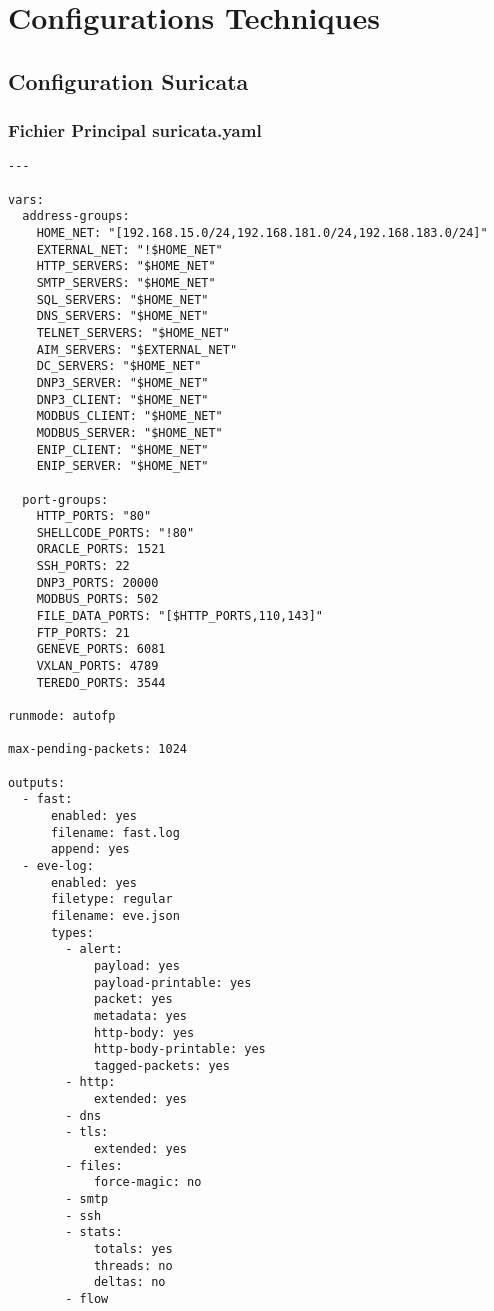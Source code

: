 \appendix

\chapter{Configurations Techniques}

\section{Configuration Suricata}

\subsection{Fichier Principal suricata.yaml}

\begin{lstlisting}[style=yamlstyle,caption=Configuration Suricata pour environnement hospitalier]
%YAML 1.1
---

vars:
  address-groups:
    HOME_NET: "[192.168.15.0/24,192.168.181.0/24,192.168.183.0/24]"
    EXTERNAL_NET: "!$HOME_NET"
    HTTP_SERVERS: "$HOME_NET"
    SMTP_SERVERS: "$HOME_NET"
    SQL_SERVERS: "$HOME_NET"
    DNS_SERVERS: "$HOME_NET"
    TELNET_SERVERS: "$HOME_NET"
    AIM_SERVERS: "$EXTERNAL_NET"
    DC_SERVERS: "$HOME_NET"
    DNP3_SERVER: "$HOME_NET"
    DNP3_CLIENT: "$HOME_NET"
    MODBUS_CLIENT: "$HOME_NET"
    MODBUS_SERVER: "$HOME_NET"
    ENIP_CLIENT: "$HOME_NET"
    ENIP_SERVER: "$HOME_NET"

  port-groups:
    HTTP_PORTS: "80"
    SHELLCODE_PORTS: "!80"
    ORACLE_PORTS: 1521
    SSH_PORTS: 22
    DNP3_PORTS: 20000
    MODBUS_PORTS: 502
    FILE_DATA_PORTS: "[$HTTP_PORTS,110,143]"
    FTP_PORTS: 21
    GENEVE_PORTS: 6081
    VXLAN_PORTS: 4789
    TEREDO_PORTS: 3544

runmode: autofp

max-pending-packets: 1024

outputs:
  - fast:
      enabled: yes
      filename: fast.log
      append: yes
  - eve-log:
      enabled: yes
      filetype: regular
      filename: eve.json
      types:
        - alert:
            payload: yes
            payload-printable: yes
            packet: yes
            metadata: yes
            http-body: yes
            http-body-printable: yes
            tagged-packets: yes
        - http:
            extended: yes
        - dns
        - tls:
            extended: yes
        - files:
            force-magic: no
        - smtp
        - ssh
        - stats:
            totals: yes
            threads: no
            deltas: no
        - flow


\end{lstlisting}
